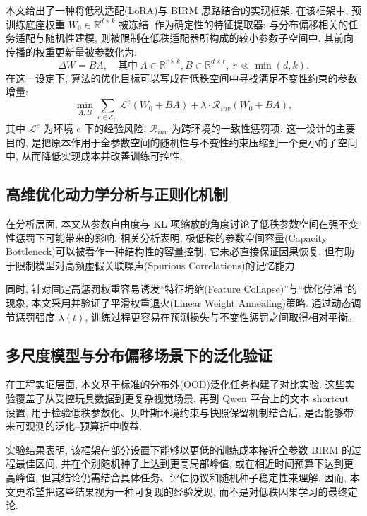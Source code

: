 \documentclass[a4paper,punct=banjiao,twoside]{ctexrep}
\theoremstyle{plain}
\theoremstyle{definition}
\theoremstyle{remark}
\begin{document}
本文给出了一种将低秩适配(LoRA)与 BIRM 思路结合的实现框架. 在该框架中, 预训练底座权重 $W_0 \in \mathbb{R}^{d \times k}$ 被冻结, 作为确定性的特征提取器; 与分布偏移相关的任务适配与随机性建模, 则被限制在低秩适配器所构成的较小参数子空间中. 其前向传播的权重更新量被参数化为:
\begin{equation}
    \Delta W = B A, \quad \text{其中} \ A \in \mathbb{R}^{r \times k}, B \in \mathbb{R}^{d \times r}, \ r \ll \min(d, k).
\end{equation}
在这一设定下, 算法的优化目标可以写成在低秩空间中寻找满足不变性约束的参数增量:
\begin{equation}
    \min_{A, B} \sum_{e \in \mathcal{E}_{tr}} \mathcal{L}^e(W_0 + BA) + \lambda \cdot \mathcal{R}_{inv}(W_0 + BA),
\end{equation}
其中 $\mathcal{L}^e$ 为环境 $e$ 下的经验风险, $\mathcal{R}_{inv}$ 为跨环境的一致性惩罚项. 这一设计的主要目的, 是把原本作用于全参数空间的随机性与不变性约束压缩到一个更小的子空间中, 从而降低实现成本并改善训练可控性.

\subsection{高维优化动力学分析与正则化机制}

在分析层面, 本文从参数自由度与 KL 项缩放的角度讨论了低秩参数空间在强不变性惩罚下可能带来的影响. 相关分析表明, 极低秩的参数空间容量(Capacity Bottleneck)可以被看作一种结构性的容量控制, 它未必直接保证因果恢复, 但有助于限制模型对高频虚假关联噪声(Spurious Correlations)的记忆能力. 

同时, 针对固定高惩罚权重容易诱发“特征坍缩(Feature Collapse)”与“优化停滞”的现象, 本文采用并验证了平滑权重退火(Linear Weight Annealing)策略. 通过动态调节惩罚强度 $\lambda(t)$, 训练过程更容易在预测损失与不变性惩罚之间取得相对平衡。

\subsection{多尺度模型与分布偏移场景下的泛化验证}

在工程实证层面, 本文基于标准的分布外(OOD)泛化任务构建了对比实验. 这些实验覆盖了从受控玩具数据到更复杂视觉场景, 再到 Qwen 平台上的文本 shortcut 设置, 用于检验低秩参数化、贝叶斯环境约束与快照保留机制结合后, 是否能够带来可观测的泛化--预算折中收益. 

实验结果表明, 该框架在部分设置下能够以更低的训练成本接近全参数 BIRM 的过程最佳区间, 并在个别随机种子上达到更高局部峰值, 或在相近时间预算下达到更高峰值, 但其结论仍需结合具体任务、评估协议和随机种子稳定性来理解. 因而, 本文更希望把这些结果视为一种可复现的经验发现, 而不是对低秩因果学习的最终定论.
\end{document}
